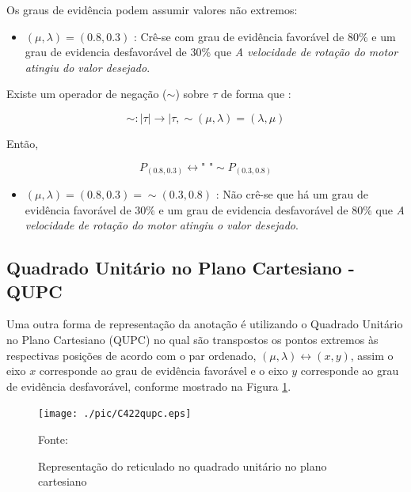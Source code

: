 Os graus de evidência podem assumir valores não extremos:

\begin{itemize}
\item 
$(\mu, \lambda ) = (0.8,0.3)$ : Crê-se com grau de evidência favorável de 80\% e um grau de evidencia desfavorável de 30\%  que \emph{A velocidade de rotação do motor atingiu do valor desejado}.
\end{itemize}

Existe um operador de negação ($\sim $) sobre $\tau$ de forma que :
\begin{center}
\begin{equation}
\sim  : \mid \tau \mid \rightarrow \mid \tau , \sim(\mu, \lambda ) = (\lambda, \mu )
\end{equation}
\end{center}

Então,
\begin{center}
\begin{equation}
P_{(0.8,0.3)} \leftrightarrow \textrm{"   "} \sim P_{(0.3,0.8)}
\end{equation}
\end{center}

\begin{itemize}
\item 
$(\mu, \lambda ) = (0.8,0.3) = \sim (0.3,0.8)$ : Não crê-se que há um grau de evidência favorável de 30\% e um grau de evidencia desfavorável de 80\% que \emph{A velocidade de rotação do motor atingiu o valor desejado}.
\end{itemize}



\subsection{Quadrado Unitário no Plano Cartesiano - QUPC}

Uma outra forma de representação da anotação é utilizando o Quadrado Unitário no Plano Cartesiano (QUPC) no qual são transpostos os pontos extremos às respectivas posições de acordo com o par ordenado,  $(\mu, \lambda ) \leftrightarrow (x,y) $, assim o eixo $x$ corresponde ao grau de evidência favorável e o eixo $y$ corresponde ao grau de evidência desfavorável, conforme mostrado na Figura \ref{fig:reticuladoQUPC}.



\begin{figure}[!htb]
\centering
\caption{Representação do reticulado no quadrado unitário no plano cartesiano}
\center\texttt{[image: ./pic/C422qupc.eps]}
\label{fig:reticuladoQUPC}

{\small Fonte: \cite{JoaoInacio}}
\end{figure}

